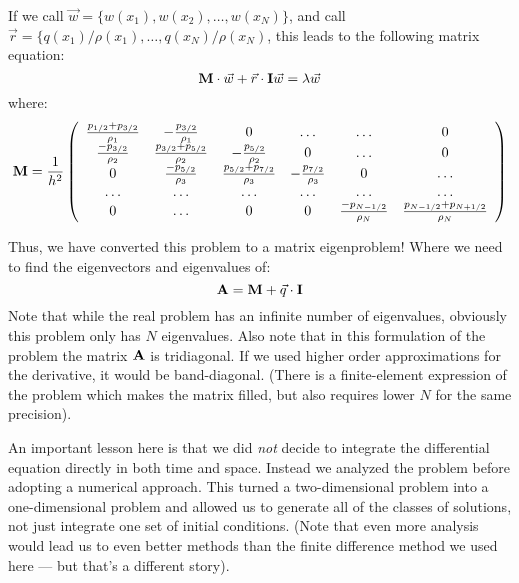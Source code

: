 If we call $\vec{w} = \{w(x_1), w(x_2), \ldots, w(x_N)\}$, and call
$\vec{r} = \{q(x_1)/\rho(x_1), \ldots, q(x_N)/\rho(x_N)$,
this leads to the following matrix equation:
\begin{equation}
{\bf M}\cdot \vec{w} + \vec{r}\cdot{\ensuremath{{\bf I}}}\vec{w} = \lambda \vec{w}
\end{equation}
where:
\begin{equation}
  {\bf M} = \frac{1}{h^2} \left(\begin{array}{cccccc}
    \frac{p_{1/2} + p_{3/2}}{\rho_1} & - \frac{p_{3/2}}{\rho_1} & 0 & \ldots & \ldots & 0 \cr
    \frac{- p_{3/2}}{\rho_2} & \frac{p_{3/2} + p_{5/2}}{\rho_2} & -\frac{p_{5/2}}{\rho_2} & 0 & \ldots & 0 \cr
    0 & \frac{- p_{5/2}}{\rho_3} & \frac{p_{5/2} + p_{7/2}}{\rho_3} & -\frac{p_{7/2}}{\rho_3} & 0 & \ldots \cr
    \ldots & \ldots & \ldots & \ldots & \ldots & \ldots \cr
    0 & \ldots & 0 & 0 & \frac{- p_{N-1/2}}{\rho_N}  & \frac{p_{N-1/2} + p_{N+1/2} }{\rho_N}
\end{array}\right)
\end{equation}

Thus, we have converted this problem to a matrix eigenproblem!  Where
we need to find the eigenvectors and eigenvalues of:
\begin{equation}
{\bf A} = {\bf M} + \vec{q}\cdot{\bf I}
\end{equation}
Note that while the real problem has an infinite number of
eigenvalues, obviously this problem only has $N$ eigenvalues. Also
note that in this formulation of the problem the   matrix ${\bf A}$ is
tridiagonal. If we used higher order approximations for the
derivative, it would be band-diagonal. (There is a finite-element
expression of the problem which makes the matrix filled, but also
requires lower $N$ for the same precision).

An important lesson here is that we did {\it not} decide to integrate
the differential equation directly in both time and space. Instead we
analyzed the problem before adopting a numerical approach. This turned
a two-dimensional problem into a one-dimensional problem and allowed
us to generate all of the classes of solutions, not just integrate
one set of initial conditions. (Note that even more analysis would
lead us to even better methods than the finite difference method we
used here --- but that's a different story).

